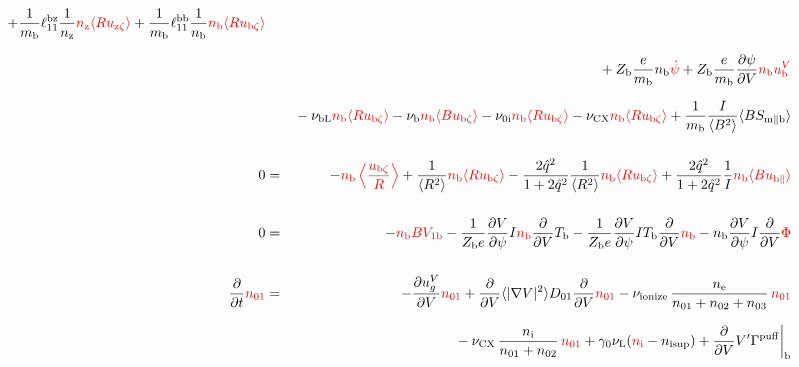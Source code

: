 \documentclass[11pt]{article}
\def\r#1{{\rm#1}}
\def\ave#1{\left\langle#1\right\rangle}
\def\aves#1{\langle#1\rangle}
\def\dd#1#2{\frac{\partial #1}{\partial #2}}
\def\para{\parallel}
\def\ddV{\frac{\partial}{\partial V}}
\def\ddt{\frac{\partial}{\partial t}}
\def\mi{m_\r{i}}
\def\mb{m_\r{b}}
\def\nee{n_\r{e}}
\def\ni{n_\r{i}}
\def\nz{n_\r{z}}
\def\nb{n_\r{b}}
\def\Te{T_\r{e}}
\def\Tb{T_\r{b}}
\def\Zi{Z_\r{i}}
\def\Zb{Z_\r{b}}
\def\uzt#1{u_{\r{#1}\zeta}}
\def\upara#1{u_{\r{#1}\para}}
\def\qhatpara#1{\hat{q}_{\r{#1}\para}}
\def\uV#1{u_\r{#1}^V}
\def\ugV{u_{g}^V}
\def\De{D_\r{e}}
\def\nun#1{\nu_\r{0#1}}
\def\nsup#1{n_\r{#1sup}}
\def\bri{\aves{B^2}\aves{R^2} - I^2}
\def\nna{n_{01}}
\def\nnb{n_{02}}
\def\nnc{n_{03}}
\def\nuL{\nu_\r{L}}
\def\nuCX{\nu_\r{CX}}
\def\nuion{\nu_\r{ionize}}
\def\nub{\nu_\r{b}}
\def\nuOL{\nu_\r{OL}}
\def\nubL{\nu_\r{bL}}
\def\red#1{\textcolor{red}{#1}}
\begin{document}
\begin{eqnarray}
  + \frac{1}{\mb} \ell_{11}^\r{bz} \frac{1}{\nz}  \red{\nz  \aves{R \uzt{z}}}
  + \frac{1}{\mb} \ell_{11}^\r{bb} \frac{1}{\nb}  \red{\nb  \aves{R \uzt{b}}}
\nonumber\\[2.5mm]&&{}
%
%
  + \Zb \frac{e}{\mb}              \nb \red{\dot{\psi}}
%
  + \Zb \frac{e}{\mb} \dd{\psi}{V} \red{\nb \uV{b}}
%
\nonumber\\[2.5mm]&&{}
%
  - \nubL  \red{\nb \aves{R \uzt{b}}}
%
  - \nub  \red{\nb \aves{B \uzt{b}}}
%
  - \nun{i} \red{\nb \aves{R \uzt{b}}}
%
  - \nuCX \red{\nb \aves{R \uzt{b}}}
%
%
  + \frac{1}{\mb} \frac{I}{\aves{B^2}} \aves{B S_{\r{m}\para\r{b}}}
%
\\[5mm]
  0 &=&
%
  - \red{\nb \ave{\frac{\uzt{b}}{R}}}
%
  + \frac{1}{\aves{R^2}} \red{\nb \aves{R\uzt{b}}}
%
  - \frac{2\hat{q}^2}{1+2\hat{q}^2} \frac{1}{\aves{R^2}}\red{\nb\aves{R\uzt{b}}}
%
  + \frac{2\hat{q}^2}{1+2\hat{q}^2} \frac{1}{I}\red{\nb \aves{B\upara{b}}}
\\[5mm]
    0 &=&
%
  - \red{\nb BV_{1\r{b}}}
%
  - \frac{1}{\Zb e} \dd{V}{\psi} I \red{\nb} \ddV \Tb 
%
  - \frac{1}{\Zb e} \dd{V}{\psi} I \Tb \ddV \red{\nb}
%
  - \nb \dd{V}{\psi} I \ddV \red{\Phi}
\\[5mm]
  \ddt \red{\nna} &=& 
%
  - \dd{\ugV}{V} \red{\nna}
%
  + \ddV \aves{|\nabla V|^2} D_{01} \ddV \red{\nna}
%
  - \nuion\, \frac{\nee}{\nna + \nnb + \nnc}\, \red{\nna}
%
\nonumber\\[2.5mm]&&{}
  - \nuCX\, \frac{\ni}{\nna + \nnb}\, \red{\nna}
%
  + \gamma_0 \nuL (\red{\ni} - \nsup{i})
%
  + \ddV V' \Gamma^\r{puff}\biggr|_\r{b}
\\[5mm]

\end{eqnarray}
\end{document}
